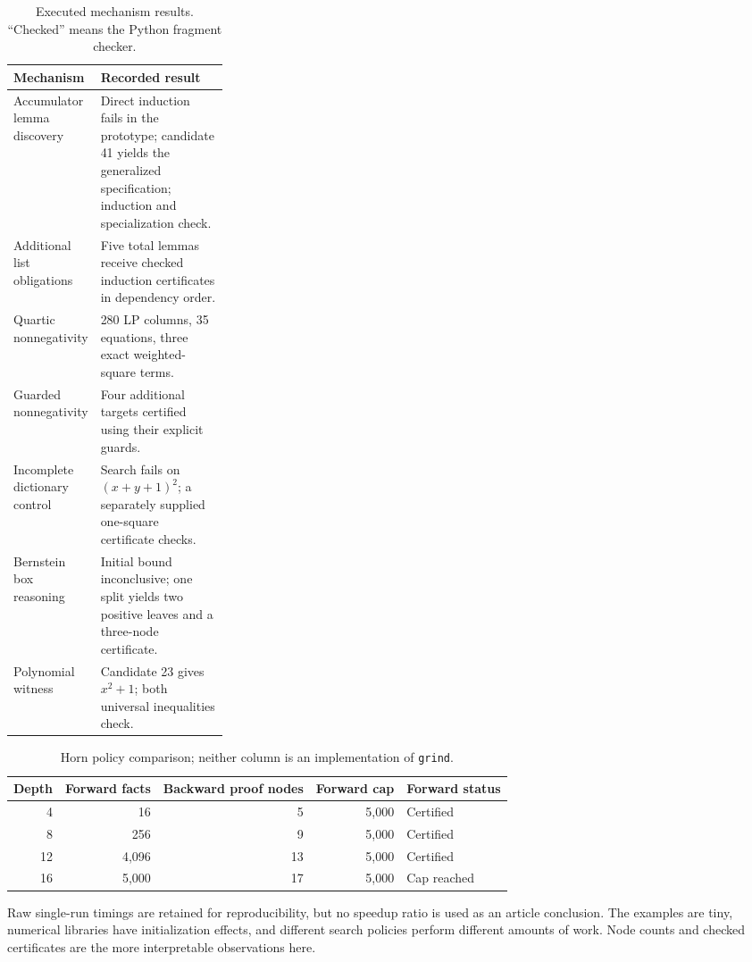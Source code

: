 \documentclass[11pt,a4paper]{article}
\begin{document}
\begin{table}[htbp]
\centering
\caption{Executed mechanism results. ``Checked'' means the Python fragment checker.}
\begin{tabularx}{\linewidth}{p{0.28\linewidth}X}
\toprule
Mechanism & Recorded result \\
\midrule
Accumulator lemma discovery & Direct induction fails in the prototype; candidate 41 yields the generalized specification; induction and specialization check. \\
Additional list obligations & Five total lemmas receive checked induction certificates in dependency order. \\
Quartic nonnegativity & 280 LP columns, 35 equations, three exact weighted-square terms. \\
Guarded nonnegativity & Four additional targets certified using their explicit guards. \\
Incomplete dictionary control & Search fails on $(x+y+1)^2$; a separately supplied one-square certificate checks. \\
Bernstein box reasoning & Initial bound inconclusive; one split yields two positive leaves and a three-node certificate. \\
Polynomial witness & Candidate 23 gives $x^2+1$; both universal inequalities check. \\
\bottomrule
\end{tabularx}
\end{table}

\begin{table}[htbp]
\centering
\caption{Horn policy comparison; neither column is an implementation of \texttt{grind}.}
\begin{tabular}{rrrrl}
\toprule
Depth & Forward facts & Backward proof nodes & Forward cap & Forward status \\
\midrule
4 & 16 & 5 & 5,000 & Certified \\
8 & 256 & 9 & 5,000 & Certified \\
12 & 4,096 & 13 & 5,000 & Certified \\
16 & 5,000 & 17 & 5,000 & Cap reached \\
\bottomrule
\end{tabular}
\end{table}

Raw single-run timings are retained for reproducibility, but no speedup ratio
is used as an article conclusion. The examples are tiny, numerical libraries
have initialization effects, and different search policies perform different
amounts of work. Node counts and checked certificates are the more interpretable
observations here.
\end{document}
